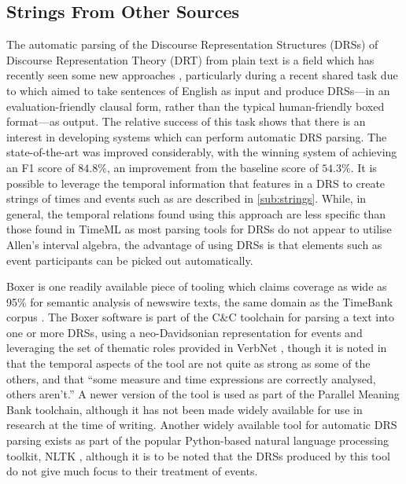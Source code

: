 \documentclass[a4paper,12pt,leqno,twoside]{article}
\begin{document}
\subsection{Strings From Other Sources}\label{sub:enhancing}
The automatic parsing of the Discourse Representation Structures (DRSs) of Discourse Representation Theory (DRT) \citep{kamp1981theory} from plain text is a field which has recently seen some new approaches \citep{abzianidze2017parallel,van-noord-etal-2018-exploring}, particularly during a recent shared task due to \citet{abzianidze2019first} which aimed to take sentences of English as input and produce DRSs---in an evaluation-friendly clausal form, rather than the typical human-friendly boxed format---as output. The relative success of this task shows that there is an interest in developing systems which can perform automatic DRS parsing. The state-of-the-art was improved considerably, with the winning system of \citet{liu2019discourse} achieving an F1 score of $84.8\%$, an improvement from the baseline score of $54.3\%$. It is possible to leverage the temporal information that features in a DRS to create strings of times and events such as are described in \cref{sub:strings}. While, in general, the temporal relations found using this approach are less specific than those found in TimeML as most parsing tools for DRSs do not appear to utilise Allen's interval algebra, the advantage of using DRSs is that elements such as event participants can be picked out automatically.

Boxer \citep{Bos2008} is one readily available piece of tooling which claims coverage as wide as 95\% for semantic analysis of newswire texts, the same domain as the TimeBank corpus \citep{pustejovsky2006timebank}. The Boxer software is part of the C\&C toolchain \citep{curran2007linguistically} for parsing a text into one or more DRSs, using a neo-Davidsonian representation for events and leveraging the set of thematic roles provided in VerbNet \citep{schuler2005verbnet}, though it is noted in \citet[p. 277]{Bos2008} that the temporal aspects of the tool are not quite as strong as some of the others, and that ``some measure and time expressions are correctly analysed, others aren't.'' A newer version of the tool is used as part of the Parallel Meaning Bank \citep{abzianidze2017parallel} toolchain, although it has not been made widely available for use in research at the time of writing. Another widely available tool for automatic DRS parsing exists as part of the popular Python-based natural language processing toolkit, NLTK \citep{Bird2009}, although it is to be noted that the DRSs produced by this tool do not give much focus to their treatment of events.
\end{document}
